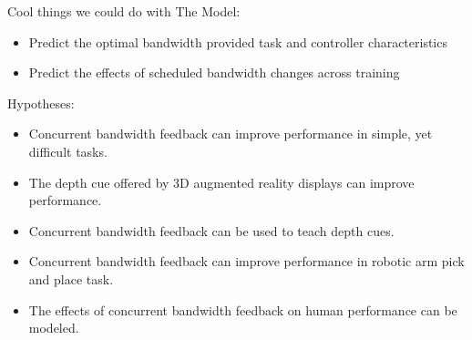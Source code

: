 \documentclass[float=false, crop=false]{standalone}
\begin{document}
Cool things we could do with The Model:
\begin{itemize}
\item Predict the optimal bandwidth provided task and controller characteristics
\item Predict the effects of scheduled bandwidth changes across training
\end{itemize}

Hypotheses:
\begin{itemize}
\item Concurrent bandwidth feedback can improve performance in simple, yet difficult tasks.
\item The depth cue offered by 3D augmented reality displays can improve performance.
\item Concurrent bandwidth feedback can be used to teach depth cues.
\item Concurrent bandwidth feedback can improve performance in robotic arm pick and place task.
\item The effects of concurrent bandwidth feedback on human performance can be modeled.
\end{itemize}
\end{document}
